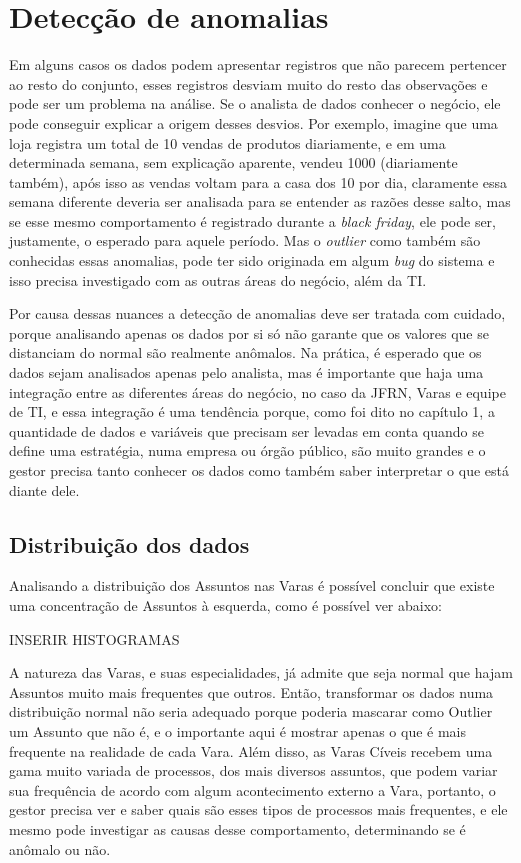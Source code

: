 \chapter{Detecção de anomalias}\label{cap_trabalho_academico}


Em alguns casos os dados podem apresentar registros que não parecem pertencer ao resto do conjunto, esses registros desviam muito do resto das observações e pode ser um problema na análise. Se o analista de dados conhecer o negócio, ele pode conseguir explicar a origem desses desvios. Por exemplo, imagine que uma loja registra um total de 10 vendas de produtos diariamente, e em uma determinada semana, sem explicação aparente, vendeu 1000 (diariamente também), após isso as vendas voltam para a casa dos 10 por dia, claramente essa semana diferente deveria ser analisada para se entender as razões desse salto, mas se esse mesmo comportamento é registrado durante a \textit{black friday}, ele pode ser, justamente, o esperado para aquele período. Mas o \textit{outlier} como também são conhecidas essas anomalias, pode ter sido originada em algum \textit{bug} do sistema e isso precisa investigado com as outras áreas do negócio, além da TI.

Por causa dessas nuances a detecção de anomalias deve ser tratada com cuidado, porque analisando apenas os dados por si só não garante que os valores que se distanciam do normal são realmente anômalos. Na prática, é esperado que os dados sejam analisados apenas pelo analista, mas é importante que haja uma integração entre as diferentes áreas do negócio, no caso da JFRN, Varas e equipe de TI, e essa integração é uma tendência porque, como foi dito no capítulo 1, a quantidade de dados e variáveis que precisam ser levadas em conta quando se define uma estratégia, numa empresa ou órgão público, são muito grandes e o gestor precisa tanto conhecer os dados como também saber interpretar o que está diante dele.

\section{Distribuição dos dados}

Analisando a distribuição dos Assuntos nas Varas é possível concluir que existe uma concentração de Assuntos à esquerda, como é possível ver abaixo:

INSERIR HISTOGRAMAS

A natureza das Varas, e suas especialidades, já admite que seja normal que hajam Assuntos muito mais frequentes que outros. Então, transformar os dados numa distribuição normal não seria adequado porque poderia mascarar como Outlier um Assunto que não é, e o importante aqui é mostrar apenas o que é mais frequente na realidade de cada Vara. Além disso, as Varas Cíveis recebem uma gama muito variada de processos, dos mais diversos assuntos, que podem variar sua frequência de acordo com algum acontecimento externo a Vara, portanto, o gestor precisa ver e saber quais são esses tipos de processos mais frequentes, e ele mesmo pode investigar as causas desse comportamento, determinando se é anômalo ou não.

